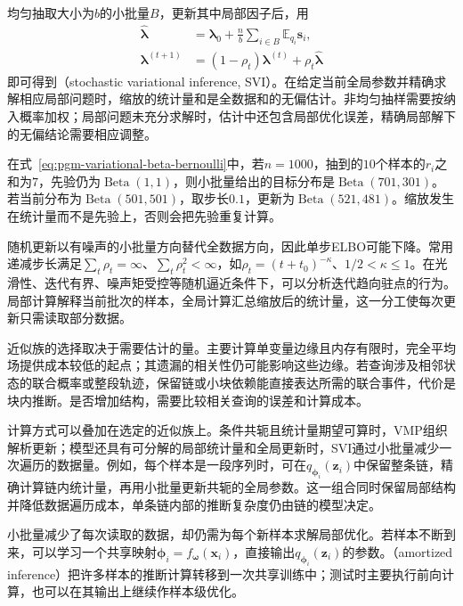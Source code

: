 均匀抽取大小为$b$的小批量$B$，更新其中局部因子后，用
\begin{equation}
  \begin{aligned}
    \widehat{\bm{\lambda}}
      &=\bm{\lambda}_0+\frac{n}{b}
           \sum_{i\in B}\mathbb E_{q_i}\bm s_i,\\
    \bm{\lambda}^{(t+1)}
      &=(1-\rho_t)\bm{\lambda}^{(t)}
          +\rho_t\widehat{\bm{\lambda}}
  \end{aligned}
  \label{eq:pgm-variational-svi}
\end{equation}
即可得到（stochastic variational inference, SVI）。在给定当前全局参数并精确求解相应局部问题时，缩放的统计量和是全数据和的无偏估计。非均匀抽样需要按纳入概率加权；局部问题未充分求解时，估计中还包含局部优化误差，精确局部解下的无偏结论需要相应调整。

在式~\eqref{eq:pgm-variational-beta-bernoulli}中，若$n=1000$，抽到的$10$个样本的$r_i$之和为$7$，先验仍为$\operatorname{Beta}(1,1)$，则小批量给出的目标分布是$\operatorname{Beta}(701,301)$。若当前分布为$\operatorname{Beta}(501,501)$，取步长$0.1$，更新为$\operatorname{Beta}(521,481)$。缩放发生在统计量而不是先验上，否则会把先验重复计算。

随机更新以有噪声的小批量方向替代全数据方向，因此单步ELBO可能下降。常用递减步长满足$\sum_t\rho_t=\infty$、$\sum_t\rho_t^2<\infty$，如$\rho_t=(t+t_0)^{-\kappa}$、$1/2<\kappa\leq1$。在光滑性、迭代有界、噪声矩受控等随机逼近条件下，可以分析迭代趋向驻点的行为。局部计算解释当前批次的样本，全局计算汇总缩放后的统计量，这一分工使每次更新只需读取部分数据。

近似族的选择取决于需要估计的量。主要计算单变量边缘且内存有限时，完全平均场提供成本较低的起点；其遗漏的相关性仍可能影响这些边缘。若查询涉及相邻状态的联合概率或整段轨迹，保留链或小块依赖能直接表达所需的联合事件，代价是块内推断。是否增加结构，需要比较相关查询的误差和计算成本。

计算方式可以叠加在选定的近似族上。条件共轭且统计量期望可算时，VMP组织解析更新；模型还具有可分解的局部统计量和全局更新时，SVI通过小批量减少一次遍历的数据量。例如，每个样本是一段序列时，可在$q_{\bm\phi_i}(\bm z_i)$中保留整条链，精确计算链内统计量，再用小批量更新共轭的全局参数。这一组合同时保留局部结构并降低数据遍历成本，单条链内部的推断复杂度仍由链的模型决定。

\label{sec:pgm-variational-amortized}

小批量减少了每次读取的数据，却仍需为每个新样本求解局部优化。若样本不断到来，可以学习一个共享映射$\bm{\phi}_i=f_{\bm{\omega}}(\bm x_i)$，直接输出$q_{\bm{\phi}_i}(\bm z_i)$的参数。（amortized inference）把许多样本的推断计算转移到一次共享训练中；测试时主要执行前向计算，也可以在其输出上继续作样本级优化。

